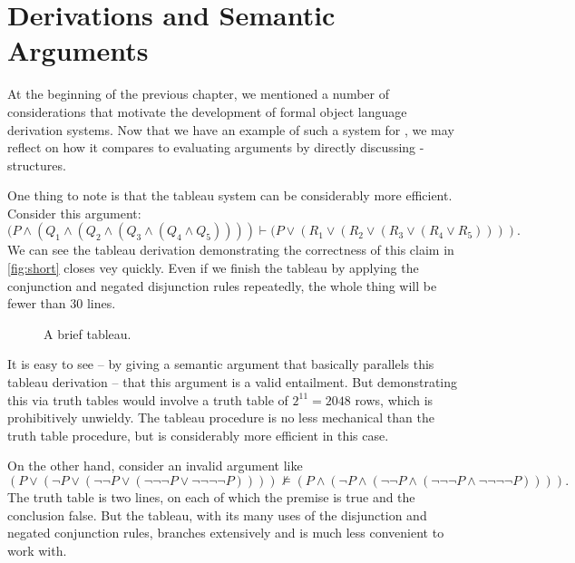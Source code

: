 
\section{Derivations and Semantic Arguments}

At the beginning of the previous chapter, we mentioned a number of considerations that motivate the development of formal object language derivation systems. Now that we have an example of such a system for \lone, we may reflect on how it compares to evaluating arguments by directly discussing \lone-structures.

One thing to note is that the tableau system can be considerably more efficient. Consider this argument: $$(P \wedge (Q_{1} \wedge (Q_{2} \wedge (Q_{3} \wedge (Q_{4} \wedge Q_{5})))) \vdash (P \vee (R_{1} \vee (R_{2} \vee (R_{3} \vee (R_{4} \vee R_{5})))).$$  We can see the tableau derivation demonstrating the correctness of this claim in \autoref{fig:short} closes vey quickly. Even if we finish the tableau by applying the conjunction and negated disjunction rules repeatedly, the whole thing will be fewer than 30 lines.

\begin{figure}[t]
	\centering 
	{
\qobitree	}\caption{A brief tableau. \label{fig:short}}
\end{figure}

It is easy to see – by giving a semantic argument that basically parallels this tableau derivation – that this argument is a valid entailment. But demonstrating this via truth tables would involve a truth table of $2^{11} = 2048$ rows, which is prohibitively unwieldy. The tableau procedure is no less mechanical than the truth table procedure, but is considerably more efficient in this case.

On the other hand, consider an invalid argument like $$(P \vee (¬P \vee (¬¬P \vee (¬¬¬P \vee ¬¬¬¬P)))) \nvDash (P \wedge (¬P \wedge (¬¬P \wedge (¬¬¬P \wedge ¬¬¬¬P)))).$$ The truth table is two lines, on each of which the premise is true and the conclusion false. But the tableau, with its many uses of the disjunction and negated conjunction rules, branches extensively and is much less convenient to work with. 

